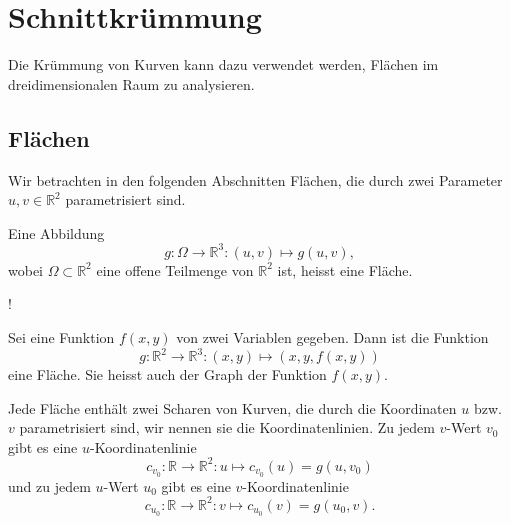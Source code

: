 %
%
%
\section{Schnittkrümmung}
Die Krümmung von Kurven kann dazu verwendet werden, Flächen im
dreidimensionalen Raum zu analysieren.

\subsection{Flächen}
Wir betrachten in den folgenden Abschnitten Flächen, die durch zwei
Parameter $u,v\in\mathbb R^2$ parametrisiert sind.

\begin{definition}
Eine Abbildung
\[
g\colon \Omega\to\mathbb R^3: (u,v)\mapsto g(u,v),
\]
wobei $\Omega\subset\mathbb R^2$
eine offene Teilmenge von $\mathbb R^2$ ist, heisst eine Fläche.
\end{definition}
!

\begin{beispiel}
Sei eine Funktion $f(x,y)$ von zwei Variablen gegeben.
Dann ist die Funktion
\[
g\colon\mathbb R^2\to \mathbb R^3
: (x,y)\mapsto (x,y,f(x,y))
\]
eine Fläche.
Sie heisst auch der Graph der Funktion $f(x,y)$.
%
\end{beispiel}

Jede Fläche enthält zwei Scharen von Kurven, die durch die Koordinaten $u$
bzw.~$v$ parametrisiert sind, wir nennen sie die Koordinatenlinien.
%
Zu jedem $v$-Wert $v_0$ gibt es eine $u$-Koordinatenlinie
\[
c_{v_0}
\colon
\mathbb R \to \mathbb R^2
:
u\mapsto
c_{v_0}(u) = g(u, v_0)
\]
und zu jedem $u$-Wert $u_0$ gibt es eine $v$-Koordinatenlinie
\[
c_{u_0}
\colon
\mathbb R \to \mathbb R^2
:
v\mapsto
c_{u_0}(v) = g(u_0, v).
\]

